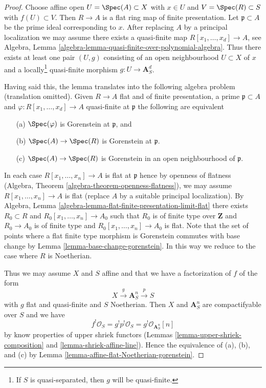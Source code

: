 \begin{proof}
Choose affine open $U = \Spec(A) \subset X$ with $x \in U$ and
$V = \Spec(R) \subset S$ with $f(U) \subset V$. Then $R \to A$
is a flat ring map of finite presentation. Let $\mathfrak p \subset A$
be the prime ideal corresponding to $x$. After replacing $A$ by a
principal localization we may assume there exists a quasi-finite map
$R[x_1, \ldots, x_d]  \to A$, see
Algebra, Lemma \ref{algebra-lemma-quasi-finite-over-polynomial-algebra}.
Thus there exists at least one pair $(U, g)$ consisting of an
open neighbourhood $U \subset X$ of $x$ and a locally\footnote{If $S$
is quasi-separated, then $g$ will be quasi-finite.} quasi-finite morphism
$g : U \to \mathbf{A}^d_S$.

\medskip\noindent
Having said this, the lemma translates into the following algebra
problem (translation omitted). Given $R \to A$ flat and of finite
presentation, a prime $\mathfrak p \subset A$ and
$\varphi : R[x_1, \ldots, x_d] \to A$ quasi-finite at $\mathfrak p$
the following are equivalent
\begin{enumerate}
\item[(a)] $\Spec(\varphi)$ is Gorenstein at $\mathfrak p$, and
\item[(b)] $\Spec(A) \to \Spec(R)$ is Gorenstein at $\mathfrak p$.
\item[(c)] $\Spec(A) \to \Spec(R)$ is Gorenstein in an open neighbourhood
of $\mathfrak p$.
\end{enumerate}
In each case $R[x_1, \ldots, x_n] \to A$ is flat at $\mathfrak p$
hence by openness of flatness
(Algebra, Theorem \ref{algebra-theorem-openness-flatness}),
we may assume $R[x_1, \ldots, x_n] \to A$
is flat (replace $A$ by a suitable principal localization).
By Algebra, Lemma \ref{algebra-lemma-flat-finite-presentation-limit-flat}
there exists $R_0 \subset R$ and $R_0[x_1, \ldots, x_n] \to A_0$
such that $R_0$ is of finite type over $\mathbf{Z}$ and
$R_0 \to A_0$ is of finite type and $R_0[x_1, \ldots, x_n] \to A_0$ is flat.
Note that the set of points where a flat finite type morphism
is Gorenstein commutes with base change by
Lemma \ref{lemma-base-change-gorenstein}.
In this way we reduce to the case where $R$ is Noetherian.

\medskip\noindent
Thus we may assume $X$ and $S$ affine and that
we have a factorization of $f$ of the form
$$
X \xrightarrow{g} \mathbf{A}^n_S \xrightarrow{p} S
$$
with $g$ flat and quasi-finite and $S$ Noetherian. Then $X$ and
$\mathbf{A}^n_S$ are compactifyable over $S$ and we have
$$
f^!\mathcal{O}_S = g^!p^!\mathcal{O}_S = g^!\mathcal{O}_{\mathbf{A}^n_S}[n]
$$
by know properties of upper shriek functors
(Lemmas \ref{lemma-upper-shriek-composition} and
\ref{lemma-shriek-affine-line}).
Hence the equivalence of (a), (b), and (c) by
Lemma \ref{lemma-affine-flat-Noetherian-gorenstein}.
\end{proof}

